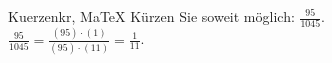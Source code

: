 \begin{MAufgabe}{Kuerzen}{kr, MaTeX}
K\"urzen Sie soweit m\"oglich: $\frac{95}{1045}$.\\ 
\ifLsg\MLoesung
\quad $\frac{95}{1045}=\frac{(95)\cdot(1)}{(95)\cdot(11)}=\frac{1}{11}$.\else\relax\fi
 \end{MAufgabe}
